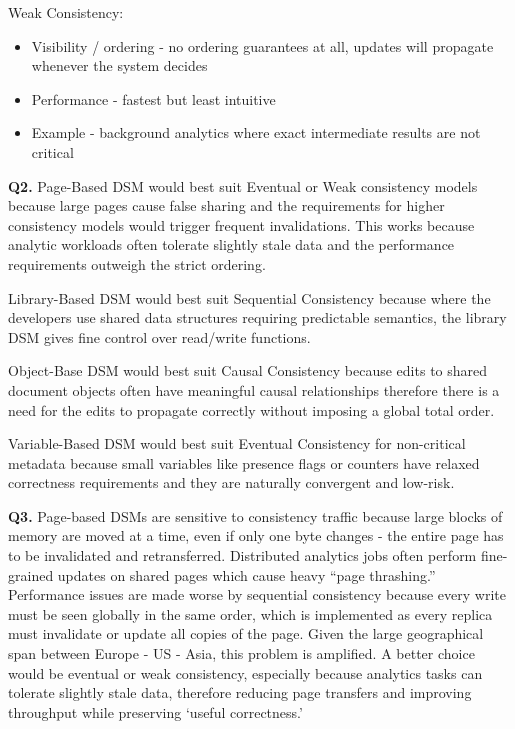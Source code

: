 Weak Consistency:
\begin{itemize}
    \item Visibility / ordering - no ordering guarantees at all, updates will propagate whenever the system decides
    \item Performance - fastest but least intuitive
    \item Example - background analytics where exact intermediate results are not critical
\end{itemize}

\textbf{Q2.} Page-Based DSM would best suit Eventual or Weak consistency models because large pages cause false sharing and the requirements for higher consistency models would trigger frequent invalidations. This works because analytic workloads often tolerate slightly stale data and the performance requirements outweigh the strict ordering.

Library-Based DSM would best suit Sequential Consistency because where the developers use shared data structures requiring predictable semantics, the library DSM gives fine control over read/write functions.

Object-Base DSM would best suit Causal Consistency because edits to shared document objects often have meaningful causal relationships therefore there is a need for the edits to propagate correctly without imposing a global total order. 

Variable-Based DSM would best suit Eventual Consistency for non-critical metadata because small variables like presence flags or counters have relaxed correctness requirements and they are naturally convergent and low-risk. 

\textbf{Q3.} Page-based DSMs are sensitive to consistency traffic because large blocks of memory are moved at a time, even if only one byte changes - the entire page has to be invalidated and retransferred. Distributed analytics jobs often perform fine-grained updates on shared pages which cause heavy ``page thrashing.'' Performance issues are made worse by sequential consistency because every write must be seen globally in the same order, which is implemented as every replica must invalidate or update all copies of the page. Given the large geographical span between Europe - US - Asia, this problem is amplified. A better choice would be eventual or weak consistency, especially because analytics tasks can tolerate slightly stale data, therefore reducing page transfers and improving throughput while preserving `useful correctness.'

